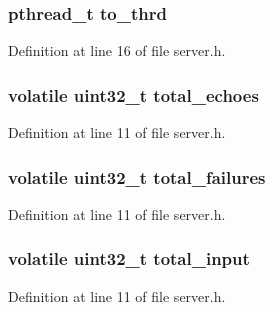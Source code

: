\subsubsection[{\texorpdfstring{to\+\_\+thrd}{to_thrd}}]{\setlength{\rightskip}{0pt plus 5cm}pthread\+\_\+t to\+\_\+thrd}\hypertarget{structserver_a672086e622555f69db447ee87ffb0dee}{}\label{structserver_a672086e622555f69db447ee87ffb0dee}


Definition at line 16 of file server.\+h.

\subsubsection[{\texorpdfstring{total\+\_\+echoes}{total_echoes}}]{\setlength{\rightskip}{0pt plus 5cm}volatile uint32\+\_\+t total\+\_\+echoes}\hypertarget{structserver_a5dc4c264e773d0bada48651a52c59c47}{}\label{structserver_a5dc4c264e773d0bada48651a52c59c47}


Definition at line 11 of file server.\+h.

\subsubsection[{\texorpdfstring{total\+\_\+failures}{total_failures}}]{\setlength{\rightskip}{0pt plus 5cm}volatile uint32\+\_\+t total\+\_\+failures}\hypertarget{structserver_a9876401c17a01e030d0d1c0cccb081b3}{}\label{structserver_a9876401c17a01e030d0d1c0cccb081b3}


Definition at line 11 of file server.\+h.

\subsubsection[{\texorpdfstring{total\+\_\+input}{total_input}}]{\setlength{\rightskip}{0pt plus 5cm}volatile uint32\+\_\+t total\+\_\+input}\hypertarget{structserver_a6272db0d7f3ee3172f5908fc6c53f52c}{}\label{structserver_a6272db0d7f3ee3172f5908fc6c53f52c}


Definition at line 11 of file server.\+h.

